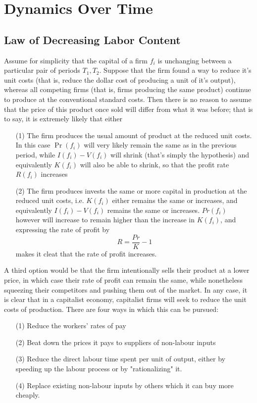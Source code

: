 \documentclass{article}
\theoremstyle{definition}
\theoremstyle{plain}
\theoremstyle{theorem}
\begin{document}
\section{Dynamics Over Time}
\subsection{Law of Decreasing Labor Content}
	Assume for simplicity that the capital of a firm $f_i$ is unchanging between a particular pair of periods $T_1,T_2$. Suppose that the firm found a way to reduce it's unit costs (that is, reduce the dollar cost of producing a unit of it's output), whereas all competing firms (that is, firms producing the same product) continue to produce at the conventional standard costs. Then there is no reason to assume that the price of this product once sold will differ from what it was before; that is to say, it is extremely likely that either
\begin{itemize}
	\item[(1)] The firm produces the usual amount of product at the reduced unit costs. In this case $\Pr(f_i)$ will very likely remain the same as in the previous period, while $I(f_i)-V(f_i)$ will shrink (that's simply the hypothesis) and equivalently $K(f_i)$ will also be able to shrink, so that the profit rate $R(f_i)$ increases
	\item[(2)] The firm produces invests the same or more capital in production at the reduced unit costs, i.e. $K(f_i)$ either remains the same or increases, and equivalently $I(f_i)-V(f_i)$ remains the same or increases. $Pr(f_i)$ however will increase to remain higher than the increase in $K(f_i)$, and expressing the rate of profit by
	\[ R = \frac{Pr}{K}-1 \]
makes it cleat that the rate of profit increases. 
\end{itemize} 
A third option would be that the firm intentionally sells their product at a lower price, in which case their rate of profit can remain the same, while nonetheless squeezing their competitors and pushing them out of the market. In any case, it is clear that in a capitalist economy, capitalist firms will seek to reduce the unit costs of production. There are four ways in which this can be pursued:
\begin{itemize}
	\item[(1)] Reduce the workers' rates of pay
	\item[(2)] Beat down the prices it pays to suppliers of non-labour inputs
	\item[(3)] Reduce the direct labour time spent per unit of output, either by speeding up the labour process or by "rationalizing" it.
	\item[(4)] Replace existing non-labour inputs by others which it can buy more cheaply. 
\end{itemize} 
\end{document}
